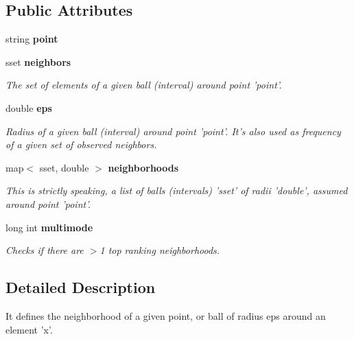 \subsection*{Public Attributes}
\begin{CompactItemize}
\item 
string {\bf point}\label{classsNeighborhood_o0}

\item 
sset {\bf neighbors}\label{classsNeighborhood_o1}

\begin{CompactList}\small\item\em The set of elements of a given ball (interval) around point 'point'. \item\end{CompactList}\item 
double {\bf eps}\label{classsNeighborhood_o2}

\begin{CompactList}\small\item\em Radius of a given ball (interval) around point 'point'. It's also used as frequency of a given set of observed neighbors. \item\end{CompactList}\item 
map$<$ sset, double $>$ {\bf neighborhoods}\label{classsNeighborhood_o3}

\begin{CompactList}\small\item\em This is strictly speaking, a list of balls (intervals) 'sset' of radii 'double', assumed around point 'point'. \item\end{CompactList}\item 
long int {\bf multimode}\label{classsNeighborhood_o4}

\begin{CompactList}\small\item\em Checks if there are $>$1 top ranking neighborhoods. \item\end{CompactList}\end{CompactItemize}


\subsection{Detailed Description}
It defines the neighborhood of a given point, or ball of radius eps around an element 'x'. 



